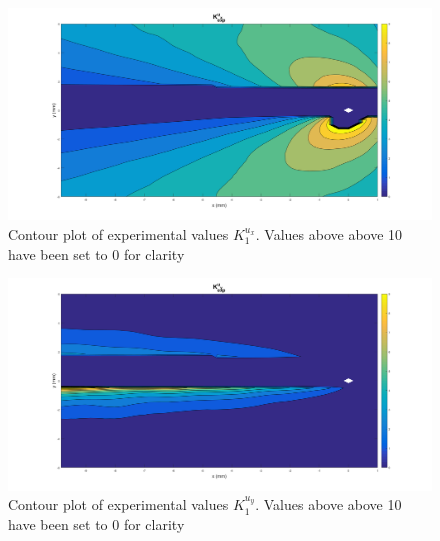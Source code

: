 \documentclass[12pt]{article}
\begin{document}
\begin{figure}[H]
	\centering
	\includegraphics[width=1\textwidth]{K_U_T_2.png}
	\caption{Contour plot of experimental values $K_1^{u_x}$.  Values above above 10 have been set to 0 for clarity}
	\label{fig:kU}
\end{figure}

\begin{figure}[H]
	\centering
	\includegraphics[width=1\textwidth]{K_V_T_2.png}
	\caption{Contour plot of experimental values $K_1^{u_y}$. Values above above 10 have been set to 0 for clarity}
	\label{fig:kV}
\end{figure}
\end{document}
